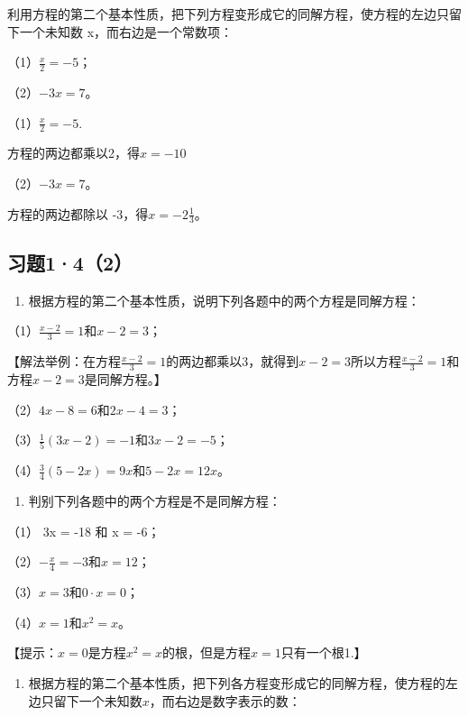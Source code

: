利用方程的第二个基本性质，把下列方程变形成它的同解方程，使方程的左边只留下一个未知数
x，而右边是一个常数项：

（1）\(\frac{x}{2} = -5\)；

（2）\(-3x = 7\)。

 （1）\(\frac{x}{2} = -5.\)

方程的两边都乘以2，得\(x = -10\)

（2）\(-3x = 7\)。

方程的两边都除以 -3，得\(x = -2 \frac{1}{3}\)。

\subsection{习题1·4（2）}

\begin{enumerate}
\item
  根据方程的第二个基本性质，说明下列各题中的两个方程是同解方程：
\end{enumerate}

（1）\(\frac{x - 2}{3} = 1\)和\(x - 2 = 3\)；

【解法举例：在方程\(\frac{x - 2}{3} = 1\)的两边都乘以3，就得到\(x - 2 = 3\)所以方程\(\frac{x - 2}{3} = 1\)和方程\(x - 2 = 3\)是同解方程。】

（2）\(4x - 8 = 6\)和\(2x - 4 = 3\)；

（3）\(\frac{1}{5} (3x - 2) = -1\)和\(3x - 2 = -5\)；

（4）\(\frac{3}{4} (5 - 2x) = 9x\)和\(5 - 2x = 12x\)。

\begin{enumerate}[start=2]
\item
  判别下列各题中的两个方程是不是同解方程：
\end{enumerate}

（1） 3x = -18 和 x = -6；

（2）\(-\frac{x}{4} = -3\)和\(x = 12\)；

（3）\(x = 3\)和\(0 \cdot x = 0\)；

（4）\(x = 1\)和\(x^{2} = x\)。

【提示：\(x = 0\)是方程\(x^{2} = x\)的根，但是方程\(x = 1\)只有一个根1.】

\begin{enumerate}[start=3]
\item
  根据方程的第二个基本性质，把下列各方程变形成它的同解方程，使方程的左边只留下一个未知数\(x\)，而右边是数字表示的数：
\end{enumerate}


